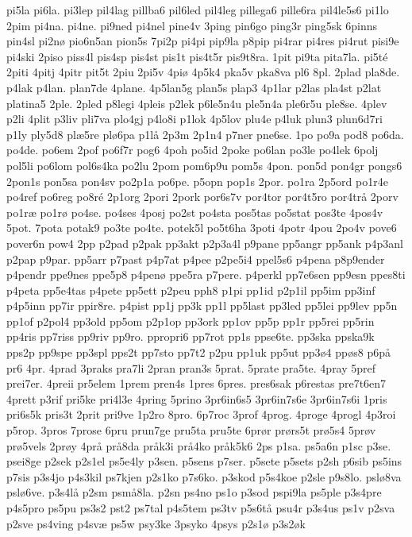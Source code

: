 {pi5la
pi6la.
pi3lep
pil4lag
pillba6
pil6led
pil4leg
pillega6
pille6ra
pil4le5s6
pi1lo
2pim
pi4na.
pi4ne.
pi9ned
pi4nel
pine4v
3ping
pin6go
ping3r
ping5sk
6pinns
pin4sl
pi2nø
pio6n5an
pion5s
7pi2p
pi4pi
pip9la
p8pip
pi4rar
pi4res
pi4rut
pisi9e
pi4ski
2piso
piss4l
pis4sp
pis4st
pis1t
pis4t5r
pis9t8ra.
1pit
pi9ta
pita7la.
pi5té
2piti
4pitj
4pitr
pit5t
2piu
2pi5v
4piø
4p5k4
pka5v
pka8va
pl6
8pl.
2plad
pla8de.
p4lak
p4lan.
plan7de
4plane.
4p5lan5g
plan5s
plap3
4p1lar
p2las
pla4st
p2lat
platina5
2ple.
2pled
p8legi
4pleis
p2lek
p6le5n4u
ple5n4a
ple6r5u
ple8se.
4plev
p2li
4plit
p3liv
pli7va
plo4gj
p4lo8i
p1lok
4p5lov
plu4e
p4luk
plun3
plun6d7ri
p1ly
ply5d8
plæ5re
plø6pa
p1lå
2p3m
2p1n4
p7ner
pne6se.
1po
po9a
pod8
po6da.
po4de.
po6em
2pof
po6f7r
pog6
4poh
po5id
2poke
po6lan
po3le
po4lek
6polj
pol5li
po6lom
pol6s4ka
po2lu
2pom
pom6p9u
pom5s
4pon.
pon5d
pon4gr
pongs6
2pon1s
pon5sa
pon4sv
po2p1a
po6pe.
p5opn
pop1s
2por.
po1ra
2p5ord
po1r4e
po4ref
po6reg
po8ré
2p1org
2pori
2pork
por6s7v
por4tor
por4t5ro
por4trå
2porv
po1ræ
po1rø
po4se.
po4ses
4posj
po2st
po4sta
pos5tas
po5stat
pos3te
4pos4v
5pot.
7pota
potak9
po3te
po4te.
potek5l
po5t6ha
3poti
4potr
4pou
2po4v
pove6
pover6n
pow4
2pp
p2pad
p2pak
pp3akt
p2p3a4l
p9pane
pp5angr
pp5ank
p4p3anl
p2pap
p9par.
pp5arr
p7past
p4p7at
p4pee
p2pe5i4
ppel5s6
p4pena
p8p9ender
p4pendr
ppe9nes
ppe5p8
p4penø
ppe5ra
p7pere.
p4perkl
pp7e6sen
pp9esn
ppes8ti
p4peta
pp5e4tas
p4pete
pp5ett
p2peu
pph8
p1pi
pp1id
p2p1il
pp5im
pp3inf
p4p5inn
pp7ir
ppir8re.
p4pist
pp1j
pp3k
pp1l
pp5last
pp3led
pp5lei
pp9lev
pp5n
pp1of
p2pol4
pp3old
pp5om
p2p1op
pp3ork
pp1ov
pp5p
pp1r
pp5rei
pp5rin
pp4ris
pp7riss
pp9riv
pp9ro.
ppropri6
pp7rot
pp1s
ppse6te.
pp3ska
ppska9k
pps2p
pp9spe
pp3spl
pps2t
pp7sto
pp7t2
p2pu
pp1uk
pp5ut
pp3ø4
ppøs8
p6på
pr6
4pr.
4prad
3praks
pra7li
2pran
pran3s
5prat.
5prate
pra5te.
4pray
5pref
prei7er.
4preii
pr5elem
1prem
pren4s
1pres
6pres.
pres6sak
p6restas
pre7t6en7
4prett
p3rif
pri5ke
pri4l3e
4pring
5prino
3pr6in6s5
3pr6in7s6e
3pr6in7s6i
1pris
pri6s5k
pris3t
2prit
pri9ve
1p2ro
8pro.
6p7roc
3prof
4prog.
4proge
4progl
4p3roi
p5rop.
3pros
7prose
6pru
prun7ge
pru5ta
pru5te
6prør
prørs5t
prø5s4
5prøv
prø5vels
2prøy
4prå
prå8da
pråk3i
prå4ko
pråk5k6
2ps
p1sa.
ps5a6n
p1sc
p3se.
psei8ge
p2sek
p2s1el
ps5e4ly
p3sen.
p5sens
p7ser.
p5sete
p5sets
p2sh
p6sib
ps5ins
p7sis
p3s4jo
p4s3kil
ps7kjen
p2s1ko
p7s6ko.
p3skod
p5s4koe
p2sle
p9s8lo.
pslø8va
pslø6ve.
p3s4lå
p2sm
psmå8la.
p2sn
ps4no
ps1o
p3sod
pspi9la
ps5ple
p3s4pre
p4s5pro
ps5pu
ps3s2
pst2
ps7tal
p4s5tem
ps3tv
p5s6tå
psu4r
p3s4us
ps1v
p2sva
p2sve
ps4ving
p4svæ
ps5w
psy3ke
3psyko
4psys
p2s1ø
p3s2øk
}
